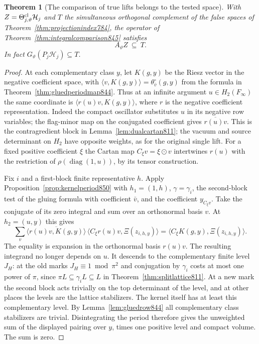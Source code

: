 \documentclass[a4paper,11pt]{article}
\newtheorem{theorem}[proposition]{Theorem}
\theoremstyle{definition}
\theoremstyle{remark}
\numberwithin{equation}{section}
\begin{document}
\begin{theorem}[The comparison of true lifts belongs to the tested space]
\leavevmode\label{thm:testedcomparison850}
With \(Z=\Theta_{j,\vartheta}^{\rm cl}\mathcal H_j\) and \(T\)
the simultaneous orthogonal complement of the false spaces of
Theorem~\ref{thm:projectionindex784}, the operator of
Theorem~\ref{thm:integralcomparison845} satisfies
\[
                        A_\vartheta Z\ \subseteq\ T .
\]
In fact \(G_\vartheta(P_j\mathcal H_j)\subseteq T\).
\end{theorem}
\begin{proof}
At each complementary class \(y\), let \(K(g,y)\) be the
Riesz vector in the negative coefficient space, with
\(\langle v,K(g,y)\rangle=\theta^\circ_{\bar v}(g,y)\) from
the formula in Theorem~\ref{thm:gluedperiodmap844}. Thus at
an infinite argument \(u\in H_2(F_\infty)\) the same coordinate
is \(\langle r(u)v,K(g,y)\rangle\), where \(r\) is the
negative coefficient representation. Indeed the compact
oscillator substitutes \(u\) in its negative row variables;
the flag-minor map on the conjugated coefficient gives
\(\overline{r(u)v}\). This is the contragredient block in
Lemma~\ref{lem:dualcartan811}; the vacuum and source determinant
on \(H_2\) have opposite weights, as for the original single
lift. For a fixed positive coefficient \(\xi\) the Cartan map
\(C_\xi v=\xi\odot v\) intertwines \(r(u)\) with the restriction
of \(\rho(\operatorname{diag}(1,u))\), by its tensor construction.

Fix \(i\) and a first-block finite representative \(h\).
Apply Proposition~\ref{prop:kernelperiod850} with \(h_1=(1,h)\),
\(\gamma=\gamma_i\), the second-block test of the gluing formula
with coefficient \(\bar v\), and the coefficient \(y_{C_\xi v}\).
Take the conjugate of its zero integral and sum over an
orthonormal basis \(v\). At \(h_2=(u,y)\) this gives
\[
  \sum_v \overline{\langle r(u)v,K(g,y)\rangle}\,
          \langle C_\xi r(u)v,\Xi(z_{i,h,y})\rangle
          =\langle C_\xi K(g,y),\Xi(z_{i,h,y})\rangle .
\]
The equality is expansion in the orthonormal basis \(r(u)v\).
The resulting integrand no longer depends on \(u\). It descends
to the complementary finite level \(J_H\): at the old marks
\(J_H\equiv1\bmod\pi^2\) and conjugation by \(\gamma_i\) costs
at most one power of \(\pi\), since
\(\pi L\subseteq\gamma_i L\subseteq L\) in
Theorem~\ref{thm:splitlattice811}. At a new mark the second
block acts trivially on the top determinant of the level, and
at other places the levels are the lattice stabilizers.
The kernel itself has at least this complementary level. By
Lemma~\ref{lem:gluedrow844} all complementary class stabilizers
are trivial. Disintegrating the period therefore gives the
unweighted sum of the displayed pairing over \(y\), times
one positive level and compact volume. The sum is zero.


\end{proof}
\end{document}
